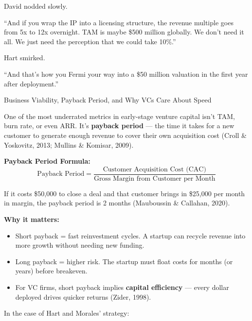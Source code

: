 David nodded slowly.

``And if you wrap the IP into a licensing structure, the revenue multiple goes from 5x to 12x overnight.  
TAM is maybe \$500 million globally. We don’t need it all. We just need the perception that we could take 10\%.''

Hart smirked.

``And that’s how you Fermi your way into a \$50 million valuation in the first year after deployment.''


\medskip

\begin{TechnicalSidebar}{Business Viability, Payback Period, and Why VCs Care About Speed}

    One of the most underrated metrics in early-stage venture capital isn’t TAM, burn rate, or even ARR.  
    It’s \textbf{payback period} — the time it takes for a new customer to generate enough revenue to cover their own acquisition cost (Croll \& Yoskovitz, 2013; Mullins \& Komisar, 2009).
    
    \medskip
    
    \textbf{Payback Period Formula:}
    \[
    \text{Payback Period} = \frac{\text{Customer Acquisition Cost (CAC)}}{\text{Gross Margin from Customer per Month}}
    \]
    
    \medskip
    
    If it costs \$50,000 to close a deal and that customer brings in \$25,000 per month in margin,  
    the payback period is 2 months (Mauboussin \& Callahan, 2020).
    
    \medskip
    
    \textbf{Why it matters:}
    
    \begin{itemize}
      \item Short payback = fast reinvestment cycles. A startup can recycle revenue into more growth without needing new funding.
      \item Long payback = higher risk. The startup must float costs for months (or years) before breakeven.
      \item For VC firms, short payback implies \textbf{capital efficiency} — every dollar deployed drives quicker returns (Zider, 1998).
    \end{itemize}
    
    \medskip
    
    In the case of Hart and Morales’ strategy:
  
    \medskip
    

\end{TechnicalSidebar}
